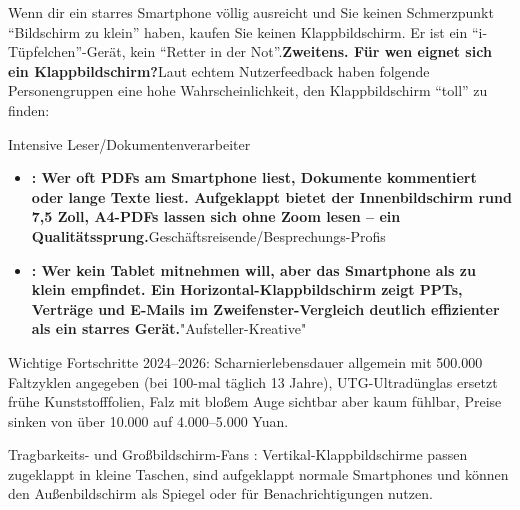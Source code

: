 


Wenn dir ein starres Smartphone völlig ausreicht und Sie keinen Schmerzpunkt “Bildschirm zu klein” haben, kaufen Sie keinen Klappbildschirm. Er ist ein “i-Tüpfelchen”-Gerät, kein “Retter in der Not”.\textbf{Zweitens. Für wen eignet sich ein Klappbildschirm?}Laut echtem Nutzerfeedback haben folgende Personengruppen eine hohe Wahrscheinlichkeit, den Klappbildschirm “toll” zu finden:

Intensive Leser/Dokumentenverarbeiter

\begin{itemize}
  \item \textbf{: Wer oft PDFs am Smartphone liest, Dokumente kommentiert oder lange Texte liest. Aufgeklappt bietet der Innenbildschirm rund 7,5 Zoll, A4-PDFs lassen sich ohne Zoom lesen – ein Qualitätssprung.}Geschäftsreisende/Besprechungs-Profis
  \item \textbf{: Wer kein Tablet mitnehmen will, aber das Smartphone als zu klein empfindet. Ein Horizontal-Klappbildschirm zeigt PPTs, Verträge und E-Mails im Zweifenster-Vergleich deutlich effizienter als ein starres Gerät.}"Aufsteller-Kreative"
\end{itemize}

Wichtige Fortschritte 2024–2026: Scharnierlebensdauer allgemein mit 500.000 Faltzyklen angegeben (bei 100-mal täglich 13 Jahre), UTG-Ultradünglas ersetzt frühe Kunststofffolien, Falz mit bloßem Auge sichtbar aber kaum fühlbar, Preise sinken von über 10.000 auf 4.000–5.000 Yuan.

\begin{tcbinfo}{Tragbarkeits- und Großbildschirm-Fans}
: Vertikal-Klappbildschirme passen zugeklappt in kleine Taschen, sind aufgeklappt normale Smartphones und können den Außenbildschirm als Spiegel oder für Benachrichtigungen nutzen.

\end{tcbinfo}


